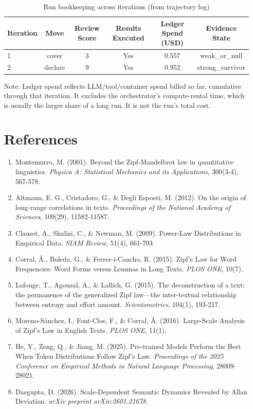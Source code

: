 \documentclass[11pt,letterpaper]{article}
\begin{document}
\begin{table}[!htbp]
\centering
\caption{Run bookkeeping across iterations (from trajectory log)}
\label{tab:bookkeeping}
\begin{tabular}{lccccc}
\toprule
Iteration & Move & Review Score & Results Executed & Ledger Spend (USD) & Evidence State \\
\midrule
1 & cover & 3 & Yes & 0.557 & weak\_or\_null \\
2 & declare & 9 & Yes & 0.952 & strong\_survivor \\
\bottomrule
\end{tabular}
\end{table}

Note: Ledger spend reflects LLM/tool/container spend billed so far, cumulative through that iteration. It excludes the orchestrator's compute-rental time, which is usually the larger share of a long run. It is not the run's total cost.

\section{References}

\begin{enumerate}
\item Montemurro, M. (2001). Beyond the Zipf-Mandelbrot law in quantitative linguistics. \textit{Physica A: Statistical Mechanics and its Applications}, 300(3-4), 567-578.
\item Altmann, E. G., Cristadoro, G., \& Degli Esposti, M. (2012). On the origin of long-range correlations in texts. \textit{Proceedings of the National Academy of Sciences}, 109(29), 11582-11587.
\item Clauset, A., Shalizi, C., \& Newman, M. (2009). Power-Law Distributions in Empirical Data. \textit{SIAM Review}, 51(4), 661-703.
\item Corral, Á., Boleda, G., \& Ferrer-i-Cancho, R. (2015). Zipf's Law for Word Frequencies: Word Forms versus Lemmas in Long Texts. \textit{PLOS ONE}, 10(7).
\item Lafouge, T., Agouzal, A., \& Lallich, G. (2015). The deconstruction of a text: the permanence of the generalized Zipf law---the inter-textual relationship between entropy and effort amount. \textit{Scientometrics}, 104(1), 193-217.
\item Moreno-Sánchez, I., Font-Clos, F., \& Corral, Á. (2016). Large-Scale Analysis of Zipf's Law in English Texts. \textit{PLOS ONE}, 11(1).
\item He, Y., Zeng, Q., \& Jiang, M. (2025). Pre-trained Models Perform the Best When Token Distributions Follow Zipf's Law. \textit{Proceedings of the 2025 Conference on Empirical Methods in Natural Language Processing}, 28009-28021.
\item Dasgupta, D. (2026). Scale-Dependent Semantic Dynamics Revealed by Allan Deviation. \textit{arXiv preprint arXiv:2601.21678}.
\end{enumerate}
\end{document}
